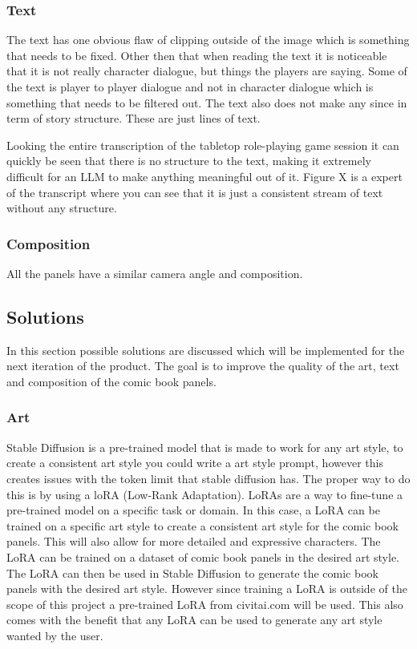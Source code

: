\subsubsection{Text}
The text has one obvious flaw of clipping outside of the image which is something that needs to be fixed. Other then that when reading the text it is noticeable that it is not really character dialogue, but things the players are saying. Some of the text is player to player dialogue and not in character dialogue which is something that needs to be filtered out. The text also does not make any since in term of story structure. These are just lines of text.

Looking the entire transcription of the tabletop role-playing game session it can quickly be seen that there is no structure to the text, making it extremely difficult for an LLM to make anything meaningful out of it. Figure X is a expert of the transcript where you can see that it is just a consistent stream of text without any structure.

\subsubsection{Composition}
All the panels have a similar camera angle and composition.

\subsection{Solutions}
In this section possible solutions are discussed which will be implemented for the next iteration of the product. The goal is to improve the quality of the art, text and composition of the comic book panels.

\subsubsection{Art}
Stable Diffusion is a pre-trained model that is made to work for any art style, to create a consistent art style you could write a art style prompt, however this creates issues with the token limit that stable diffusion has. The proper way to do this is by using a loRA (Low-Rank Adaptation). LoRAs are a way to fine-tune a pre-trained model on a specific task or domain. In this case, a LoRA can be trained on a specific art style to create a consistent art style for the comic book panels. This will also allow for more detailed and expressive characters. The LoRA can be trained on a dataset of comic book panels in the desired art style. The LoRA can then be used in Stable Diffusion to generate the comic book panels with the desired art style. However since training a LoRA is outside of the scope of this project a pre-trained LoRA from civitai.com will be used. This also comes with the benefit that any LoRA can be used to generate any art style wanted by the user.

